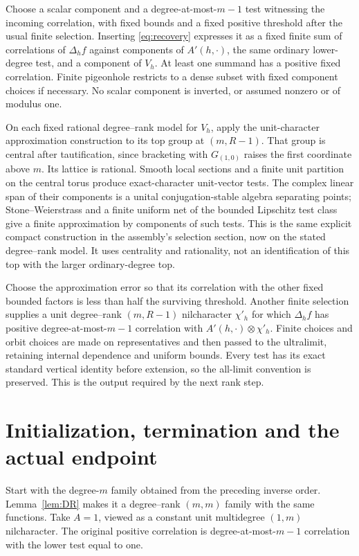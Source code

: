 \documentclass[11pt]{article}
\begin{document}
Choose a scalar component and a degree-at-most-$m-1$ test witnessing
the incoming correlation, with fixed bounds and a fixed positive
threshold after the usual finite selection. Inserting
\eqref{eq:recovery} expresses it as a fixed finite sum of correlations
of $\Delta_h f$ against components of $A'(h,\cdot)$, the same
ordinary lower-degree test, and a component of $V_h$. At least one
summand has a positive fixed correlation. Finite pigeonhole restricts
to a dense subset with fixed component choices if necessary. No scalar
component is inverted, or assumed nonzero or of modulus one.

On each fixed rational degree--rank model for $V_h$, apply the
unit-character approximation construction to its top group at
$(m,R-1)$. That group is central after tautification, since bracketing
with $G_{(1,0)}$ raises the first coordinate above $m$. Its lattice
is rational. Smooth local sections and a finite unit partition on the
central torus produce exact-character unit-vector tests. The complex linear span of their components
is a unital conjugation-stable algebra separating points; Stone--Weierstrass
and a finite uniform net of the bounded Lipschitz test class give a
finite approximation by components of such tests. This is the same
explicit compact construction in the assembly's selection section,
now on the stated degree--rank model. It uses centrality and rationality,
not an identification of this top with the larger ordinary-degree top.

Choose the approximation error so that its correlation with the other
fixed bounded factors is less than half the surviving threshold.
Another finite selection supplies a unit degree--rank $(m,R-1)$
nilcharacter $\chi'_h$ for which $\Delta_h f$ has positive
degree-at-most-$m-1$ correlation with
$A'(h,\cdot)\otimes\chi'_h$. Finite choices and orbit choices are
made on representatives and then passed to the ultralimit, retaining
internal dependence and uniform bounds. Every test has its exact
standard vertical identity before extension, so the all-limit
convention is preserved. This is the output required by the next
rank step.

\section{Initialization, termination and the actual endpoint}

Start with the degree-$m$ family obtained from the preceding inverse
order. Lemma~\ref{lem:DR} makes it a degree--rank $(m,m)$ family
with the same functions. Take $A=1$, viewed as a constant unit
multidegree $(1,m)$ nilcharacter. The original positive correlation
is degree-at-most-$m-1$ correlation with the lower test equal to one.
\end{document}
